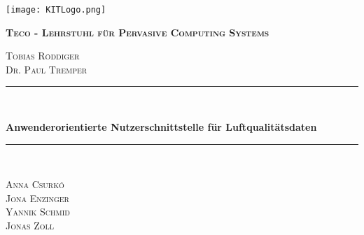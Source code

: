 \begin{titlepage}
  \centering
  \texttt{[image: KITLogo.png]}\par\vspace{1cm}
	  {\scshape \bfseries Teco - Lehrstuhl für Pervasive Computing Systems\par}
	  \vspace{0.25cm}
  	{\scshape Tobias Röddiger\\Dr. Paul Tremper\par}
  	\vspace{1.5cm}

    \newcommand{\HRule}{\rule{\linewidth}{0.5mm}}
    {\color{mintgreen}\HRule} \\[0.4cm]
  	{\huge \bfseries \LARGE Anwenderorientierte Nutzerschnittstelle für Luftqualitätsdaten\par}
    {\color{mintgreen}\HRule} \\[1cm]
  	\vspace{2cm}
  	{\scshape \Large Anna Csurkó\\Jona Enzinger\\Yannik Schmid\\Jonas Zoll\par}
  	\vfill

\end{titlepage}
